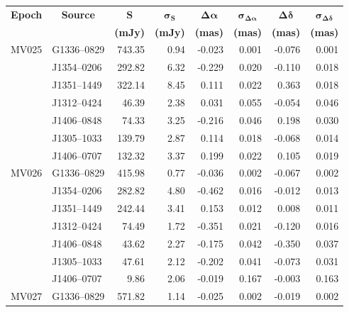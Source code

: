 \begin{table}[h]
    \footnotesize
	\centering
	\onehalfspacing
	\begin{tabular}{llrrrrrr} 
	\toprule
	\multicolumn{1}{c}{\bf Epoch} &
	\multicolumn{1}{c}{\bf Source} & 
	\multicolumn{1}{c}{ $\boldsymbol{S}$} & 
	\multicolumn{1}{c}{ $\boldsymbol{\sigma_S}$} & 
	\multicolumn{1}{c}{ $\boldsymbol{\Delta\alpha}$ } &
	\multicolumn{1}{c}{ $\boldsymbol{\sigma_{\Delta\alpha}}$ } & 
	\multicolumn{1}{c}{ $\boldsymbol{\Delta\delta}$ } &
	\multicolumn{1}{c}{ $\boldsymbol{\sigma_{\Delta\delta}}$ } \\
	\multicolumn{1}{c}{} & 
	\multicolumn{1}{c}{} & 
	\multicolumn{1}{c}{ \textbf{(mJy)} }&
	\multicolumn{1}{c}{ \textbf{(mJy)} }&
	\multicolumn{1}{c}{ \textbf{(mas)} }&
	\multicolumn{1}{c}{ \textbf{(mas)} }&
	\multicolumn{1}{c}{ \textbf{(mas)} }&
	\multicolumn{1}{c}{ \textbf{(mas)} }\\
	\midrule
	MV025 & G1336--0829 & 743.35 & 0.94  & -0.023  & 0.001  & -0.076  &  0.001 \\
	& J1354--0206 & 292.82 & 6.32  & -0.229  & 0.020  & -0.110  &  0.018 \\
	& J1351--1449 & 322.14 & 8.45  &  0.111  & 0.022  &  0.363  &  0.018 \\
	& J1312--0424 &  46.39 & 2.38  &  0.031  & 0.055  & -0.054  &  0.046 \\
	& J1406--0848 &  74.33 & 3.25  & -0.216  & 0.046  &  0.198  &  0.030 \\
	& J1305--1033 & 139.79 & 2.87  &  0.114  & 0.018  & -0.068  &  0.014 \\
	& J1406--0707 & 132.32 & 3.37  &  0.199  & 0.022  &  0.105  &  0.019 \\ \hline
	MV026 & G1336--0829 & 415.98 & 0.77  & -0.036  & 0.002  & -0.067  &  0.002 \\
	& J1354--0206 & 282.82 & 4.80  & -0.462  & 0.016  & -0.012  &  0.013 \\
	& J1351--1449 & 242.44 & 3.41  &  0.153  & 0.012  &  0.008  &  0.011 \\
	& J1312--0424 &  74.49 & 1.72  & -0.351  & 0.021  & -0.120  &  0.016 \\
    & J1406--0848 &  43.62 & 2.27  & -0.175  & 0.042  & -0.350  &  0.037 \\
	& J1305--1033 &  47.61 & 2.12  & -0.202  & 0.041  & -0.073  &  0.031 \\
	& J1406--0707 &   9.86 & 2.06  & -0.019  & 0.167  & -0.003  &  0.163 \\ \hline
	MV027 & G1336--0829 & 571.82 & 1.14  & -0.025  & 0.002  & -0.019  &  0.002 \\

\end{tabular}
\end{table}
